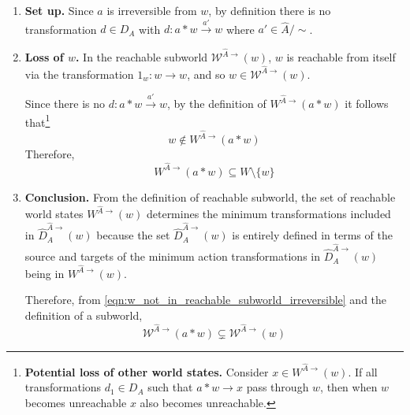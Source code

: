 \begin{proofE}
\begin{enumerate}
    \item \textbf{Set up.}
    Since $a$ is irreversible from $w$, by definition there is no transformation $d \in D_{A}$ with $d: a \ast w \xrightarrow{a'} w$ where $a' \in \hat{A}/\sim$.

    \item \textbf{Loss of $w$.}
    In the reachable subworld $\mathscr{W}^{\hat{A}\to}(w)$, $w$ is reachable from itself via the transformation $1_{w}: w \to w$, and so $w \in \mathscr{W}^{\hat{A}\to}(w)$.
    
    Since there is no $d: a \ast w \xrightarrow{a'} w$, by the definition of $W^{\hat{A}\to}(a \ast w)$ it follows that\footnote{
    \textbf{Potential loss of other world states.}
    Consider $x \in W^{\hat{A}\to}(w)$.
    If all transformations $d_{1} \in D_{A}$ such that $a \ast w \to x$ pass through $w$, then when $w$ becomes unreachable $x$ also becomes unreachable.
    }
    \begin{equation}
        w \not\in W^{\hat{A}\to}(a \ast w)
        \label{eqn:w_not_in_reachable_subworld_irreversible}
    \end{equation}
    Therefore,
    \begin{equation}
        W^{\hat{A}\to}(a \ast w) \subseteq W \setminus \{w\}
    \end{equation}

    \item \textbf{Conclusion.}
    From the definition of reachable subworld, the set of reachable world states $W^{\hat{A}\to}(w)$ determines the minimum transformations included in $\hat{D}_{A}^{\hat{A}\to}(w)$ because the set $\hat{D}_{A}^{\hat{A}\to}(w)$ is entirely defined in terms of the source and targets of the minimum action transformations in $\hat{D}_{A}^{\hat{A}\to}(w)$ being in $W^{\hat{A}\to}(w)$.
    
    Therefore, from \cref{eqn:w_not_in_reachable_subworld_irreversible} and the definition of a subworld,
    \begin{equation}
        \mathscr{W}^{\hat{A}\to}(a \ast w) \subsetneq \mathscr{W}^{\hat{A}\to}(w)
    \end{equation}
\end{enumerate}
\end{proofE}



